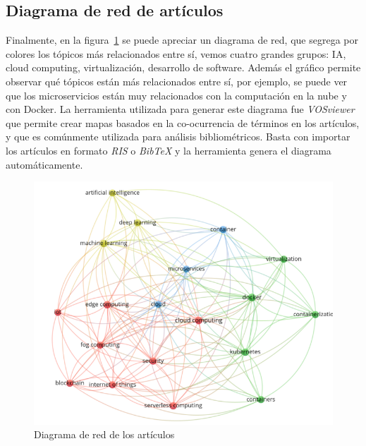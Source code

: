\subsection{Diagrama de red de artículos}
Finalmente, en la figura~\ref{fig:diagrama-red-articulos} se puede apreciar un diagrama de red, que segrega por colores los tópicos más relacionados entre sí, vemos cuatro grandes grupos: IA, cloud computing, virtualización, desarrollo de software. Además el gráfico permite observar qué tópicos están más relacionados entre sí, por ejemplo, se puede ver que los microservicios están muy relacionados con la computación en la nube y con Docker. La herramienta utilizada para generar este diagrama fue \textit{VOSviewer}~\citep{vosviewer_website} que permite crear mapas basados en la co-ocurrencia de términos en los artículos, y que es comúnmente utilizada para análisis bibliométricos. Basta con importar los artículos en formato \textit{RIS} o \textit{BibTeX} y la herramienta genera el diagrama automáticamente.
\begin{figure}[H]
    \centering
    \includegraphics[scale=0.8]{tablas-images/cp2/diagrama-red-busqueda.png}
    \caption{Diagrama de red de los artículos}\label{fig:diagrama-red-articulos}
\end{figure}